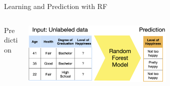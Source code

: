 \documentclass[11pt,compress,t,notes=noshow, xcolor=table]{beamer}
\begin{document}
\begin{vbframe}{Learning and Prediction with RF}
\begin{columns}
\begin{column}{0.05\textwidth} 
\begin{center}
\vspace{0.7cm}
Prediction
\end{center}
\end{column}
\begin{column}{0.95\textwidth} 
\begin{center}
  \includegraphics[width = 0.6\textwidth]{figure_man/nutshell-randomforest-prediction.png} 
\end{center}
\end{column}
\end{columns}

\end{vbframe} 

\end{document}
